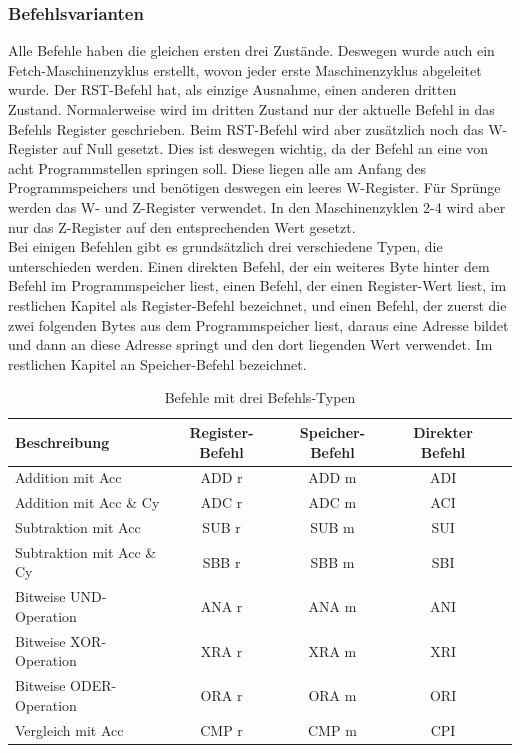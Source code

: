\documentclass[12pt]{article}
\newcommand{\imgSpaceBefore}{\vspace{10pt}}
\begin{document}
\subsubsection{Befehlsvarianten}
Alle Befehle haben die gleichen ersten drei Zustände. Deswegen wurde auch ein Fetch-Maschinenzyklus erstellt, wovon jeder erste Maschinenzyklus abgeleitet wurde. Der RST-Befehl hat, als einzige Ausnahme, einen anderen dritten Zustand. Normalerweise wird im dritten Zustand nur der aktuelle Befehl in das Befehls Register geschrieben. Beim RST-Befehl wird aber zusätzlich noch das W-Register auf Null gesetzt. Dies ist deswegen wichtig, da der Befehl an eine von acht Programmstellen springen soll. Diese liegen alle am Anfang des Programmspeichers und benötigen deswegen ein leeres W-Register. Für Sprünge werden das W- und Z-Register verwendet. In den Maschinenzyklen 2-4 wird aber nur das Z-Register auf den entsprechenden Wert gesetzt.
\\

\noindent
Bei einigen Befehlen gibt es grundsätzlich drei verschiedene Typen, die unterschieden werden. Einen direkten Befehl, der ein weiteres Byte hinter dem Befehl im Programmspeicher liest, einen Befehl, der einen Register-Wert liest, im restlichen Kapitel als Register-Befehl bezeichnet, und einen Befehl, der zuerst die zwei folgenden Bytes aus dem Programmspeicher liest, daraus eine Adresse bildet und dann an diese Adresse springt und den dort liegenden Wert verwendet. Im restlichen Kapitel an Speicher-Befehl bezeichnet.

\imgSpaceBefore
\begin{table}[H]
\centering
\begin{tabular}{|l|c|c|c|c| } 
 \hline
 Beschreibung & Register-Befehl & Speicher-Befehl & Direkter Befehl \\
 \hline 
 Addition mit Acc & ADD r & ADD m & ADI \\ 
 Addition mit Acc \& Cy & ADC r & ADC m & ACI \\ 
 Subtraktion mit Acc & SUB r & SUB m & SUI \\ 
 Subtraktion mit Acc \& Cy & SBB r & SBB m & SBI \\ 
 Bitweise UND-Operation & ANA r & ANA m & ANI \\ 
 Bitweise XOR-Operation & XRA r & XRA m & XRI \\ 
 Bitweise ODER-Operation & ORA r & ORA m & ORI \\ 
 Vergleich mit Acc & CMP r & CMP m & CPI \\ 
 \hline
\end{tabular}
\caption{Befehle mit drei Befehls-Typen}
\label{table:instr_types}
\end{table}
\end{document}
